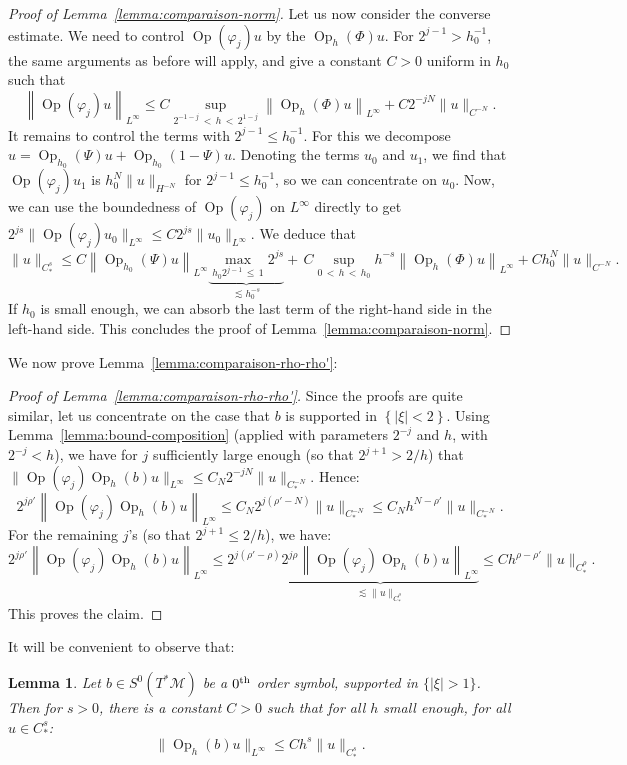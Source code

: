 \documentclass[10pt]{amsart}
\newtheorem{lemm}[theo]{Lemma}\newtheorem{prop}[theo]{Proposition}\newtheorem{coro}[theo]{Corollary}\newtheorem{conj}[theo]{Conjecture}
\theoremstyle{definition}\newtheorem{defi}[theo]{Definition}\newtheorem{rema}[theo]{Remark}\newtheorem{exam}[theo]{Example}\newtheorem{exem}[theo]{Example}\newtheorem{nota}[theo]{Notation}
\newcommand{\M}{\mathcal{M}}
\DeclareMathOperator{\Op}{Op}
\begin{document}
\begin{proof}[Proof of Lemma~\ref{lemma:comparaison-norm}]
Let us now consider the converse estimate. We need to control $\Op(\varphi_j)u$ by the $\Op_h(\Phi)u$. For $2^{j-1} > h_0^{-1}$, the same arguments as before will apply, and give a constant $C>0$ uniform in $h_0$ such that
\[
\left\|\Op(\varphi_j)u\right\|_{L^\infty} \leq C \sup_{2^{-1-j}\,<\,h\,<\,2^{1-j}} \left\|\Op_h(\Phi)u\right\|_{L^\infty} + C 2^{-jN} \|u \|_{C^{-N}}.
\]
It remains to control the terms with $2^{j-1} \leq h_0^{-1}$. For this we decompose $u= \Op_{h_0}(\Psi)u + \Op_{h_0}(1-\Psi)u$. Denoting the terms $u_0$ and $u_1$, we find that $\Op(\varphi_j)u_1$ is $h_0^N\|u\|_{H^{-N}}$ for $2^{j-1}\leq h_0^{-1}$, so we can concentrate on $u_0$. Now, we can use the boundedness of $\Op(\varphi_j)$ on $L^\infty$ directly to get $2^{js} \| \Op(\varphi_j)u_0 \|_{L^\infty} \leq C 2^{js} \|u_0\|_{L^\infty}$. We deduce that
\[
\|u \|_{C^s_\ast} \leq C \left\|\Op_{h_0}(\Psi)u\right\|_{L^\infty} \underbrace{\max_{ h_0 2^{j-1}\,\leq\,1} 2^{js}}_{\lesssim h_0^{-s}} +\,C \sup_{0\,<\,h\,<\,h_0} h^{-s} \left\| \Op_h(\Phi) u\right\|_{L^\infty} + C h_0^N \|u \|_{C^{-N}}.
\]
If $h_0$ is small enough, we can absorb the last term of the right-hand side in the left-hand side. This concludes the proof of Lemma~\ref{lemma:comparaison-norm}.
\end{proof}

We now prove Lemma~\ref{lemma:comparaison-rho-rho'}:

\begin{proof}[Proof of Lemma~\ref{lemma:comparaison-rho-rho'}]
Since the proofs are quite similar, let us concentrate on the case that $b$ is supported in $\left\{|\xi|<2\right\}$. Using Lemma~\ref{lemma:bound-composition} (applied with parameters $2^{-j}$ and $h$, with $2^{-j} < h$), we have for $j$ sufficiently large enough (so that $2^{j+1} > 2/h$) that $\|\Op(\varphi_j)\Op_h(b)u\|_{L^\infty} \leq C_N 2^{-jN}\|u\|_{C^{-N}_*}$. Hence:
\[
2^{j \rho'} \left\|\Op(\varphi_j) \Op_h(b) u \right\|_{L^\infty} \leq C_N 2^{j(\rho'-N)} \|u\|_{C^{-N}_*} \leq C_N h^{N-\rho'} \|u\|_{C^{-N}_*}.
\]
For the remaining $j$'s (so that $2^{j+1} \leq 2/h$), we have:
\[
2^{j \rho'} \left\|\Op(\varphi_j) \Op_h(b) u \right\|_{L^\infty} \leq 2^{j(\rho'-\rho)} \underbrace{2^{j\rho} \left\|\Op(\varphi_j) \Op_h(b) u \right\|_{L^\infty}}_{\lesssim \|u\|_{C^\rho_*}} \leq C h^{\rho-\rho'} \|u\|_{C^\rho_*}.
\]
This proves the claim.
\end{proof}


It will be convenient to observe that:

\begin{lemm}\label{lemma:control-by-Cs}
Let $b \in S^0(T^*\M)$ be a $0^{\rm th}$ order symbol, supported in $\{|\xi|>1\}$. Then for $s>0$, there is a constant $C>0$ such that for all $h$ small enough, for all $u\in C^s_\ast$:
\[
\| \Op_h(b) u \|_{L^\infty} \leq C h^s \| u \|_{C^s_\ast}.
\]
\end{lemm}
\end{document}
